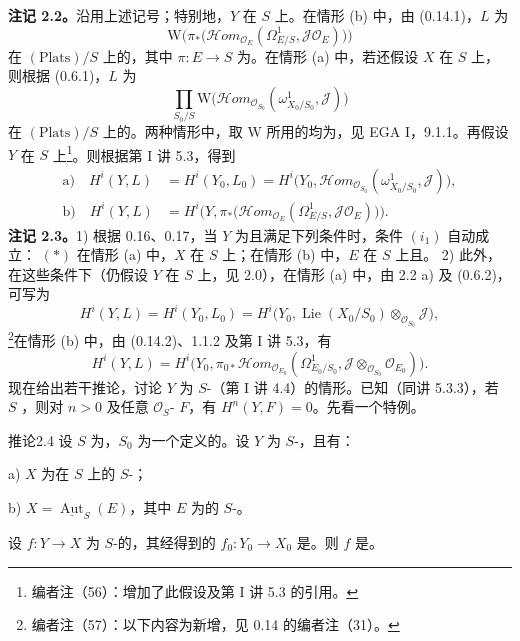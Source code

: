 \textbf{注记 2.2。}沿用上述记号；特别地，$Y$ 在 $S$ 上。在情形 (b) 中，由 (0.14.1)，$L$ 为
\[
 \mathrm W\bigl(\pi_*\bigl(\mathscr{H}\!om_{\mathcal O_E}(\Omega^1_{E/S},\mathcal J\mathcal O_E)\bigr)\bigr)
\]
在 $(\mathrm{Plats})/S$ 上的，其中 $\pi:E\to S$ 为。在情形 (a) 中，若还假设 $X$ 在 $S$ 上，则根据 (0.6.1)，$L$ 为
\[
 \prod_{S_0/S}\mathrm W\bigl(\mathscr{H}\!om_{\mathcal O_{S_0}}(\omega^1_{X_0/S_0},\mathcal J)\bigr)
\]
在 $(\mathrm{Plats})/S$ 上的。两种情形中，取 $\mathrm W$ 所用的均为，见 EGA I，9.1.1。再假设 $Y$ 在 $S$ 上\footnote{编者注（56）：增加了此假设及第 I 讲 5.3 的引用。}。则根据第 I 讲 5.3，得到
\[
\begin{aligned}
 \text{a)}\quad H^i(Y,L)&=H^i(Y_0,L_0)
 =H^i\bigl(Y_0,\mathscr{H}\!om_{\mathcal O_{S_0}}(\omega^1_{X_0/S_0},\mathcal J)\bigr),\\
 \text{b)}\quad H^i(Y,L)&=H^i\bigl(Y,\pi_*\bigl(\mathscr{H}\!om_{\mathcal O_E}
 (\Omega^1_{E/S},\mathcal J\mathcal O_E)\bigr)\bigr).
\end{aligned}
\]
\textbf{注记 2.3。}1) 根据 0.16、0.17，当 $Y$ 为且满足下列条件时，条件 $(i_1)$ 自动成立：
\noindent $(*)$ 在情形 (a) 中，$X$ 在 $S$ 上；在情形 (b) 中，$E$ 在 $S$ 上且。
2) 此外，在这些条件下（仍假设 $Y$ 在 $S$ 上，见 2.0），在情形 (a) 中，由 2.2 a) 及 (0.6.2)，可写为
\[
 H^i(Y,L)=H^i(Y_0,L_0)
 =H^i\bigl(Y_0,\operatorname{Lie}(X_0/S_0)\otimes_{\mathcal O_{S_0}}\mathcal J\bigr),
\]
\footnote{编者注（57）：以下内容为新增，见 0.14 的编者注（31）。}在情形 (b) 中，由 (0.14.2)、1.1.2 及第 I 讲 5.3，有
\[
 H^i(Y,L)=H^i\bigl(Y_0,\pi_{0*}\mathscr{H}\!om_{\mathcal O_{E_0}}
 (\Omega^1_{E_0/S_0},\mathcal J\otimes_{\mathcal O_{S_0}}\mathcal O_{E_0})\bigr).
\]
现在给出若干推论，讨论 $Y$ 为 $S$-（第 I 讲 4.4）的情形。已知（同讲 5.3.3），若 $S$ ，则对 $n>0$ 及任意 $\mathcal O_S$- $F$，有 $H^n(Y,F)=0$。先看一个特例。
\begin{SGAresult}{推论}{2.4}
设 $S$ 为，$S_0$ 为一个定义的。设 $Y$ 为 $S$-，且有：

 a) $X$ 为在 $S$ 上的 $S$-；

 b) $X=\underline{\operatorname{Aut}}_S(E)$，其中 $E$ 为的 $S$-。

设 $f:Y\to X$ 为 $S$-的，其经得到的 $f_0:Y_0\to X_0$ 是。则 $f$ 是。
\end{SGAresult}
